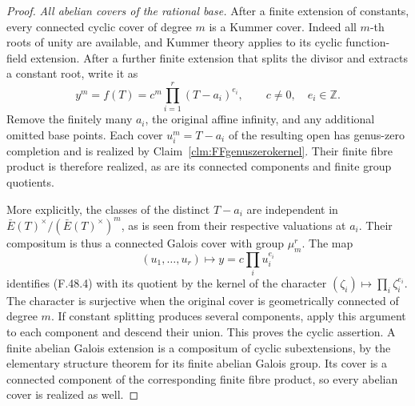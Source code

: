 \documentclass[11pt]{article}
\begin{document}
\begin{proof}
\emph{All abelian covers of the rational base.}
After a finite extension of constants, every connected
cyclic cover of degree \(m\) is a Kummer cover.
Indeed all \(m\)-th roots of unity are available,
and Kummer theory applies to its cyclic function-field
extension. After a further finite extension that splits
the divisor and extracts a constant root, write it as
\[
       y^m=f(T)=c^m\prod_{i=1}^r(T-a_i)^{e_i},
           \qquad c\ne0,\quad e_i\in\mathbb Z.
                                                        \tag{F.48.4}
\]
Remove the finitely many \(a_i\), the original affine
infinity, and any additional omitted base points.
Each cover \(u_i^m=T-a_i\) of the resulting open
has genus-zero completion and is realized by
Claim~\ref{clm:FFgenuszerokernel}. Their finite fibre
product is therefore realized, as are its connected
components and finite group quotients.

More explicitly, the classes of the distinct
\(T-a_i\) are independent in
\(\bar E(T)^\times/(\bar E(T)^\times)^m\), as is
seen from their respective valuations at \(a_i\).
Their compositum is thus a connected Galois cover
with group \(\mu_m^r\). The map
\[
       (u_1,\ldots,u_r)\longmapsto
                     y=c\prod_i u_i^{e_i}
                                                        \tag{F.48.5}
\]
identifies (F.48.4) with its quotient by the kernel
of the character
\((\zeta_i)\mapsto\prod_i\zeta_i^{e_i}\).
The character is surjective when the original cover
is geometrically connected of degree \(m\). If
constant splitting produces several components, apply
this argument to each component and descend their
union. This proves the cyclic assertion. A finite
abelian Galois extension is a compositum of cyclic
subextensions, by the elementary structure theorem
for its finite abelian Galois group. Its cover is a
connected component of the corresponding finite fibre
product, so every abelian cover is realized as well.


\end{proof}
\end{document}
